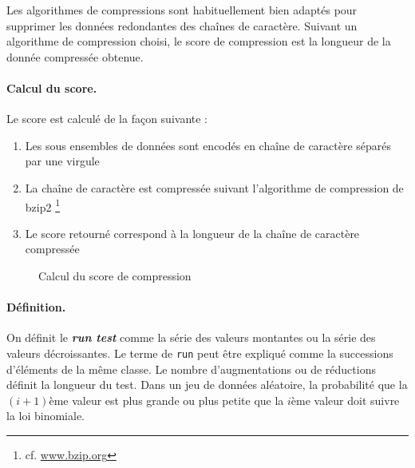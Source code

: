 Les algorithmes de compressions sont habituellement bien adaptés pour supprimer les données redondantes des chaînes de caractère. Suivant un algorithme de compression choisi, le score de compression est la longueur de la donnée compressée obtenue. 

\paragraph{Calcul du score.\\}
Le score est calculé de la façon suivante :
\begin{enumerate}
\item Les sous ensembles de données sont encodés en chaîne de caractère séparés par une virgule
\item La chaîne de caractère est compressée suivant l'algorithme de compression de bzip2 \footnote{cf. \url{www.bzip.org}}
\item Le score retourné correspond à la longueur de la chaîne de caractère compressée
\end{enumerate}

\begin{figure}[H]
\begin{center}
\end{center}
\caption{Calcul du score de compression}
\end{figure}

\paragraph{Définition.\\}
On définit le \textbf{\textit{run test}} comme la série des valeurs montantes ou la série des valeurs décroissantes. Le terme de \texttt{run} peut être expliqué comme la successions d'éléments de la même classe. Le nombre d'augmentations ou de réductions définit la longueur du test.  Dans un jeu de données aléatoire, la probabilité que la $(i+1)$ème valeur est plus grande ou plus petite que la $i$ème valeur doit suivre la loi binomiale.\\

